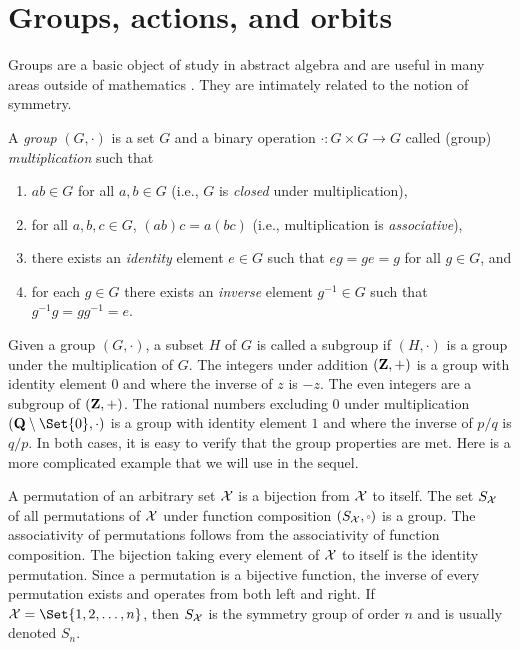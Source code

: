 \chapter{\label{app:def}Groups, actions, and orbits}
\setcounter{example}{0}

Groups are a basic object of study in abstract algebra and
are useful in many areas outside of mathematics \cite{armstrong1997groups, dummit2003abstract, lang2002algebra}.  They are intimately
related to the notion of symmetry.

\begin{definition}
A \emph{group} $(G, \cdot)$ is a set $G$ and a binary operation $\cdot: G \times G \to G$
called (group) \emph{multiplication} such that
\begin{enumerate}
\item $ab \in G$ for all $a, b \in G$ (i.e., $G$ is \emph{closed} under multiplication),
\item for all $a, b, c \in G$, $(ab)c = a(bc)$ (i.e., multiplication is \emph{associative}),
\item there exists an \emph{identity} element $e \in G$ such that $eg = ge = g$ for all $g \in G$, and
\item for each $g \in G$ there exists an \emph{inverse} element $g^{-1} \in G$ such that $g^{-1}g = gg^{-1} = e$.
\end{enumerate}
\end{definition}

Given a group $(G, \cdot)$, a subset $H$ of $G$ is called a subgroup if $(H, \cdot)$ is a group
under the multiplication of $G$.  The integers under
addition $(\mathbf{Z}, +)$ is a group with identity element $0$ and where the
inverse of $z$ is $-z$.  The even integers are a subgroup of $(\mathbf{Z}, +)$.
The rational numbers excluding $0$ under multiplication
$(\rationals\setminus \Set{0}, \cdot)$ is a group with identity element $1$ and
where the inverse of $p/q$ is $q/p$. In both cases, it is easy to verify that
the group properties are met.  Here is a more complicated example that we will
use in the sequel. 

\begin{example}
A permutation of an arbitrary set $\mathcal{X}$ is a bijection from $\mathcal{X}$ to itself.  The
set $S_{\mathcal{X}}$ of all permutations of $\mathcal{X}$ under function composition
$(S_\CX, \smallcirc)$ is a group.  The associativity of permutations follows from the
associativity of function composition.  The bijection taking every element of
$\mathcal{X}$ to itself is the identity permutation. Since a permutation is a bijective function, the
inverse of every permutation exists and operates from both left and right.  
If $\CX = \Set{1, 2, \dots, n}$, then $S_{\mathcal{X}}$ is the symmetry group of order $n$
and is usually denoted $S_n$.
\end{example}


